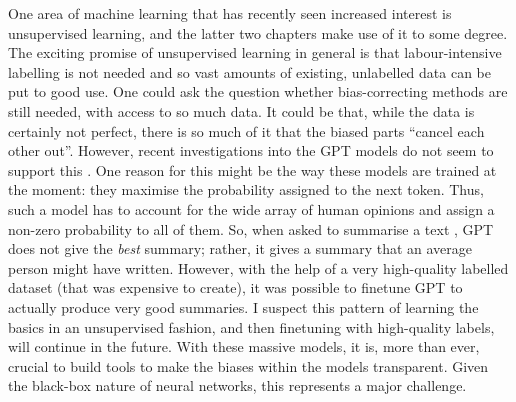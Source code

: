 One area of machine learning that has recently seen increased interest is unsupervised learning,
and the latter two chapters make use of it to some degree.
The exciting promise of unsupervised learning in general is
that labour-intensive labelling is not needed and so vast amounts of existing, unlabelled data can be put to good use.
One could ask the question whether bias-correcting methods are still needed, with access to so much data.
It could be that, while the data is certainly not perfect,
there is so much of it that the biased parts ``cancel each other out''.
However, recent investigations into the GPT models \citep{radford2018improving,radford2019language,brown2020language} do not seem to support this \citep{khalifa2021distributional}.
One reason for this might be the way these models are trained at the moment:
they maximise the probability assigned to the next token.
Thus, such a model has to account for the wide array of human opinions and assign a non-zero probability to all of them.
So, when asked to summarise a text \citep{stiennon2020learning}, GPT does not give the \emph{best} summary;
rather, it gives a summary that an average person might have written.
However, with the help of a very high-quality labelled dataset (that was expensive to create),
it was possible to finetune GPT to actually produce very good summaries.
I suspect this pattern of learning the basics in an unsupervised fashion,
and then finetuning with high-quality labels, will continue in the future.
With these massive models,
it is, more than ever, crucial to build tools to make the biases within the models transparent.
Given the black-box nature of neural networks, this represents a major challenge.

